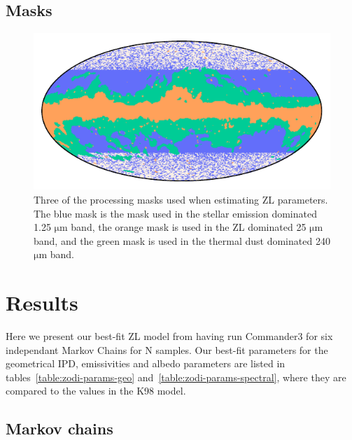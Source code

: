 \documentclass[twocolumn]{aa}
\begin{document}
\subsection{Masks}

\begin{figure}
    \centering
    \includegraphics[width=\columnwidth]{figs/zodi_proc_masks.pdf}
    \caption{Three of the processing masks used when estimating ZL parameters. The blue mask is the 
    mask used in the stellar emission dominated 1.25 $\mathrm{\mu m}$ band, the orange mask is used 
    in the ZL dominated 25 $\mathrm{\mu m}$ band, and the green mask is used in the thermal dust dominated 
    240 $\mathrm{\mu m}$ band.}
    \label{fig:zodi-procmask}
\end{figure}





\section{Results}\label{sect:improved-model}
Here we present our best-fit ZL model from having run Commander3 for six independant
Markov Chains for N samples. Our best-fit parameters for the geometrical IPD, emissivities 
and albedo parameters are listed in tables~\ref{table:zodi-params-geo} 
and~\ref{table:zodi-params-spectral}, where they are compared to the values in the K98 model.


\subsection{Markov chains}
\end{document}
